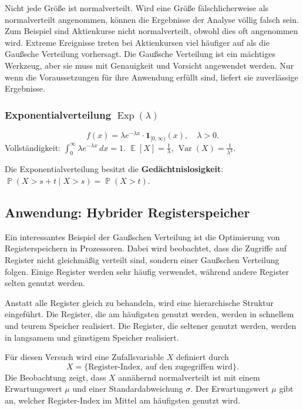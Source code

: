 ﻿\documentclass[12pt,a4paper]{article}
\theoremstyle{definition}
\theoremstyle{plain}
\theoremstyle{remark}
\DeclareMathOperator{\E}{\mathbb{E}}
\DeclareMathOperator{\Var}{Var}
\DeclareMathOperator{\Prob}{\mathbb{P}}
\begin{document}
Nicht jede Größe ist normalverteilt. Wird eine Größe fälschlicherweise als
normalverteilt angenommen, können die Ergebnisse der Analyse völlig falsch
sein. Zum Beispiel sind Aktienkurse nicht normalverteilt, obwohl dies oft
angenommen wird. Extreme Ereignisse treten bei Aktienkursen viel häufiger auf
als die Gaußsche Verteilung vorhersagt. Die Gaußsche Verteilung ist ein
mächtiges Werkzeug, aber sie muss mit Genauigkeit und Vorsicht angewendet
werden. Nur wenn die Voraussetzungen für ihre Anwendung erfüllt sind, liefert
sie zuverlässige Ergebnisse.

\subsubsection{Exponentialverteilung $\operatorname{Exp}(\lambda)$}

\[
  f(x) = \lambda e^{-\lambda x} \cdot \mathbf{1}_{[0,\infty)}(x), \quad \lambda>0.
\]
Vollständigkeit: $\int_0^{\infty}\lambda e^{-\lambda x}\,dx = 1$.
$\E[X] = \frac{1}{\lambda}$, $\Var(X) = \frac{1}{\lambda^2}$.

Die Exponentialverteilung besitzt die \textbf{Gedächtnislosigkeit}:
$\Prob(X > s+t \mid X > s) = \Prob(X > t)$.

\subsection{Anwendung: Hybrider Registerspeicher}
\label{subsec:registerspeicher}

Ein interessantes Beispiel der Gaußschen Verteilung ist die Optimierung von
Registerspeichern in Prozessoren. Dabei wird beobachtet, dass die Zugriffe
auf Register nicht gleichmäßig verteilt sind, sondern einer Gaußschen
Verteilung folgen. Einige Register werden sehr häufig verwendet, während
andere Register selten genutzt werden.

Anstatt alle Register gleich zu behandeln, wird eine hierarchische Struktur
eingeführt. Die Register, die am häufigsten genutzt werden, werden in
schnellem und teurem Speicher realisiert. Die Register, die seltener genutzt
werden, werden in langsamem und günstigem Speicher realisiert.

Für diesen Versuch wird eine Zufallsvariable $X$ definiert durch
\[
  X = \{\text{Register-Index, auf den zugegriffen wird}\}.
\]
Die Beobachtung zeigt, dass $X$ annähernd normalverteilt ist mit einem
Erwartungswert $\mu$ und einer Standardabweichung $\sigma$. Der Erwartungswert
$\mu$ gibt an, welcher Register-Index im Mittel am häufigsten genutzt wird.
\end{document}
